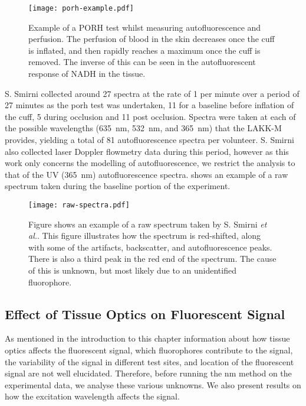 \begin{figure}[!htpb]
  \centering
  \texttt{[image: porh-example.pdf]}
  \caption{Example of a PORH test whilst measuring autofluorescence and perfusion. The perfusion of blood in the skin decreases once the cuff is inflated, and then rapidly reaches a maximum once the cuff is removed. The inverse of this can be seen in the autofluorescent response of NADH in the tissue.}
  \label{fig:porh}
\end{figure}

S. Smirni collected around 27 spectra at the rate of 1 per minute over a period of 27 minutes as the \gls*{porh} test was undertaken, 11 for a baseline before inflation of the cuff, 5 during occlusion and 11 post occlusion.
Spectra were taken at each of the possible wavelengths (635~nm, 532~nm, and 365~nm) that the LAKK-M provides, yielding a total of 81 autofluorescence spectra per volunteer.
S. Smirni also collected laser Doppler flowmetry data during this period, however as this work only concerns the modelling of autofluorescence, we restrict the analysis to that of the UV (365~nm) autofluorescence spectra.
 shows an example of a raw spectrum taken during the baseline portion of the experiment.

\begin{figure}[!htpb]
  \centering
  \texttt{[image: raw-spectra.pdf]}
  \caption{Figure shows an example of a raw spectrum taken by S. Smirni \textit{et al.}. This figure illustrates how the spectrum is red-shifted, along with some of the artifacts, backscatter, and autofluorescence peaks. There is also a third peak in the red end of the spectrum. The cause of this is unknown, but most likely due to an unidentified fluorophore.}
  \label{fig:slavodataexample}
\end{figure}

\subsection{Effect of Tissue Optics on Fluorescent Signal}

As mentioned in the introduction to this chapter information about how tissue optics affects the fluorescent signal, which fluorophores contribute to the signal, the variability of the signal in different test sites, and location of the fluorescent signal are not well elucidated. 
Therefore, before running the \gls*{nm} method on the experimental data, we analyse these various unknowns.
We also present results on how the excitation wavelength affects the signal.


